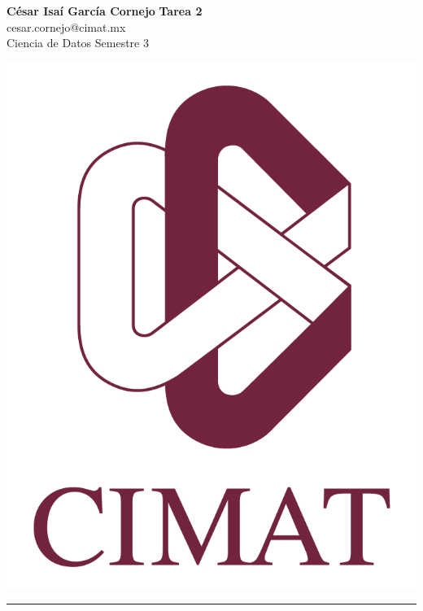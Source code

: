 \documentclass[a4paper, 11pt]{article}
\begin{document}
	\noindent
	
	\begin{minipage}[b][1.2cm][t]{0.8\textwidth}
		\large\textbf{César Isaí García Cornejo} \hfill \textbf{Tarea 2}  \\
		cesar.cornejo@cimat.mx \hfill \\
		\normalsize Ciencia de Datos \hfill Semestre 3\\
	\end{minipage}
	
	\hspace{14.4cm}
	\begin{minipage}[b][0.03cm][t]{0.12\linewidth}
		
		\vspace{-2.2cm}
		\includegraphics[scale=0.3]{Images/EscudoCimat.png}
	\end{minipage}
	
	\noindent\rule{7in}{2.8pt}
	
\end{document}
